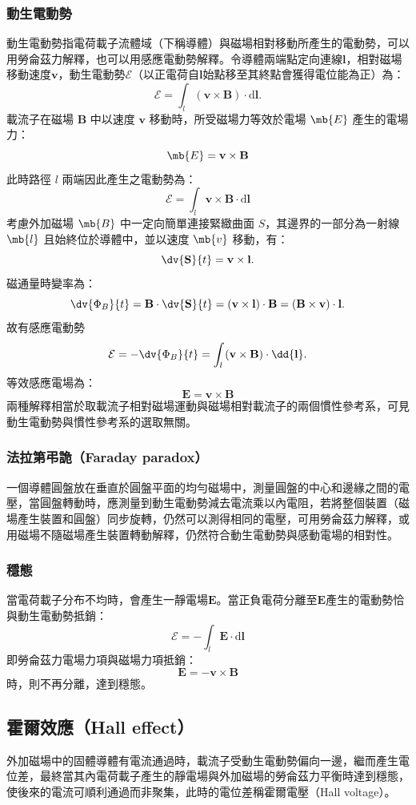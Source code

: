 \documentclass[a4paper,12pt]{report}
\begin{document}
\begin{itemize}
\subsubsection{動生電動勢}
動生電動勢指電荷載子流體域（下稱導體）與磁場相對移動所產生的電動勢，可以用勞侖茲力解釋，也可以用感應電動勢解釋。令導體兩端點定向連線$\mathbf{l}$，相對磁場移動速度$\mathbf{v}$，動生電動勢$\mathcal{E}$（以正電荷自$\mathbf{l}$始點移至其終點會獲得電位能為正）為：
\[\mathcal{E}=\int_{l}\left(\mathbf{v}\times\mathbf{B}\right)\cdot\mathrm{d}\mathbf{l}.\]
載流子在磁場 $\mathbf{B}$ 中以速度 $\mathbf{v}$ 移動時，所受磁場力等效於電場 $\mb{E}$ 產生的電場力：
\[\mb{E}=\mathbf{v}\times\mathbf{B}\]
此時路徑 $l$ 兩端因此產生之電動勢為：
\[\mathcal{E}=\int_l\mathbf{v}\times\mathbf{B}\cdot\mathrm{d}\mathbf{l}\]
考慮外加磁場 $\mb{B}$ 中一定向簡單連接緊緻曲面 $S$，其邊界的一部分為一射線 $\mb{l}$ 且始終位於導體中，並以速度 $\mb{v}$ 移動，有：
\[\dv{\mathbf{S}}{t}=\mathbf{v}\times\mathbf{l}.\]
磁通量時變率為：
\[\dv{\Phi_B}{t}=\mathbf{B}\cdot\dv{\mathbf{S}}{t}=(\mathbf{v}\times\mathbf{l})\cdot\mathbf{B}=(\mathbf{B}\times\mathbf{v})\cdot\mathbf{l}.\]
故有感應電動勢
\[\mathcal{E}=-\dv{\Phi_B}{t}=\int_l\left(\mathbf{v}\times\mathbf{B}\right)\cdot\dd{\mathbf{l}}.\]
等效感應電場為：
\[\mathbf{E}=\mathbf{v}\times\mathbf{B}\]
兩種解釋相當於取載流子相對磁場運動與磁場相對載流子的兩個慣性參考系，可見動生電動勢與慣性參考系的選取無關。
\subsubsection{法拉第弔詭（Faraday paradox）}
一個導體圓盤放在垂直於圓盤平面的均勻磁場中，測量圓盤的中心和邊緣之間的電壓，當圓盤轉動時，應測量到動生電動勢減去電流乘以內電阻，若將整個裝置（磁場產生裝置和圓盤）同步旋轉，仍然可以測得相同的電壓，可用勞侖茲力解釋，或用磁場不隨磁場產生裝置轉動解釋，仍然符合動生電動勢與感動電場的相對性。
\subsubsection{穩態}
當電荷載子分布不均時，會產生一靜電場$\mathbf{E}$。當正負電荷分離至$\mathbf{E}$產生的電動勢恰與動生電動勢抵銷：
\[\mathcal{E}=-\int_l\mathbf{E}\cdot\mathrm{d}\mathbf{l}\]
即勞侖茲力電場力項與磁場力項抵銷：
\[\mathbf{E}=-\mathbf{v}\times\mathbf{B}\]
時，則不再分離，達到穩態。
\subsection{霍爾效應（Hall effect）}
外加磁場中的固體導體有電流通過時，載流子受動生電動勢偏向一邊，繼而產生電位差，最終當其內電荷載子產生的靜電場與外加磁場的勞侖茲力平衡時達到穩態，使後來的電流可順利通過而非聚集，此時的電位差稱霍爾電壓（Hall voltage）。


\end{itemize}
\end{document}
